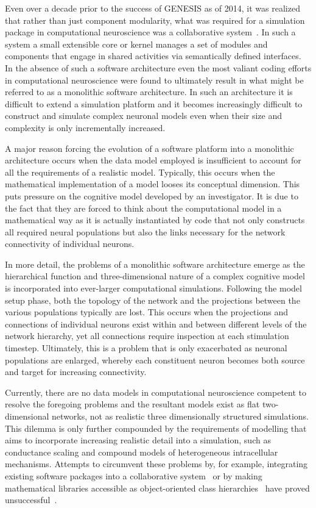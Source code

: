 \documentclass{article}
\begin{document}
Even over a decade prior to the success of GENESIS as of 2014, it was realized that rather than just component modularity, what was required for a simulation package in computational neuroscience was a collaborative system~\cite{cornelis03}. In such a system a small extensible core or kernel manages a set of modules and components that engage in shared activities via semantically defined interfaces. In the absence of such a software architecture even the most valiant coding efforts in computational neuroscience were found to ultimately result in what might be referred to as a monolithic software architecture. In such an architecture it is difficult to extend a simulation platform and it becomes increasingly difficult to construct and simulate complex neuronal models even when their size and complexity is only incrementally increased.

A major reason forcing the evolution of a software platform into a monolithic architecture occurs when the data model employed is insufficient to account for all the requirements of a realistic model. Typically, this occurs when the mathematical implementation of a model looses its conceptual dimension. This puts pressure on the cognitive model developed by an investigator. It is due to the fact that they are forced to think about the computational model in a mathematical way as it is actually instantiated by code that not only constructs all required neural populations but also the links necessary for the network connectivity of individual neurons.

In more detail, the problems of a monolithic software architecture emerge as the hierarchical function and three-dimensional nature of a complex cognitive model is incorporated into ever-larger computational simulations. Following the model setup phase, both the topology of the network and the projections between the various populations typically are lost. This occurs when the projections and connections of individual neurons exist within and between different levels of the network hierarchy, yet all connections require inspection at each stimulation timestep. Ultimately, this is a problem that is only exacerbated as neuronal populations are enlarged, whereby each constituent neuron becomes both source and target for increasing connectivity.

Currently, there are no data models in computational neuroscience competent to resolve the foregoing problems and the resultant models exist as flat two-dimensional networks, not as realistic three dimensionally structured simulations. This dilemma is only further compounded by the requirements of modelling that aims to incorporate increasing realistic detail into a simulation, such as conductance scaling and compound models of heterogeneous intracellular mechanisms. Attempts to circumvent these problems by, for example, integrating existing software packages into a collaborative system~\cite{goddard01:_neosim} or by making mathematical libraries accessible as object-oriented class hierarchies~\cite{vibert01} have proved unsuccessful~\cite{cornelis03}.
\end{document}

